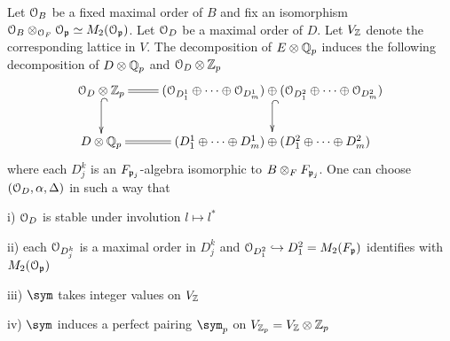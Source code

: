 \documentclass{amsart}
\newcommand{\inj}{\hookrightarrow}
\numberwithin{equation}{section}
\begin{document}
Let $\mathcal{O}_B$ be a fixed maximal order of $B$ and fix an isomorphism $\mathcal{O}_B
\otimes_{\mathcal{O}_F} \mathcal{O}_{\mathfrak{p}} \simeq M_2(\mathcal{O}_{\mathfrak{p}})$. Let $\mathcal{O}_D$ be a maximal order
of $D$. Let $V_{\mathbb{Z}}$ denote the corresponding lattice in $V$. The 
decomposition of $E\otimes \mathbb{Q}_p$ induces the following decomposition of 
$D \otimes \mathbb{Q}_p$ and $\mathcal{O}_D\otimes \mathbb{Z}_p$
$$\xymatrix{
\Ou_D \otimes \Z_p \ar@{^{(}->}[d] \ar@{=}[r]&  (\Ou_{D^1_1} \oplus \cdots \oplus \Ou_{D^1_m}) 
\oplus (\Ou_{D_1^2} \oplus \cdots \oplus \Ou_{D^2_m}) \ar@{^{(}->}[d] \\
D \otimes \Q_p \ar@{=}[r]& 
(D_1^1 \oplus \cdots \oplus D^1_m) \oplus (D_1^2 \oplus
\cdots \oplus D_m^2) 
}$$
where each $D_j^k$ is an $F_{\mathfrak{p}_j}$-algebra isomorphic to $B \otimes_F
F_{\mathfrak{p}_j}$. One can choose $(\mathcal{O}_D,\alpha,\Delta)$ in such a way that

i) $\mathcal{O}_D$ is stable under involution $l \mapsto l^*$

ii) each $\mathcal{O}_{D_j^k}$ is a maximal order in $D^k_j$ and $\Ou_{D^2_1} \inj
D_1^2= M_2(F_\gp)$ identifies with $M_2(\mathcal{O}_{\mathfrak{p}})$

iii) $\sym$ takes integer values on $V_{\mathbb{Z}}$

iv) $\sym$ induces a perfect pairing $\sym_p$ on $V_{\mathbb{Z}_p} = V_{\mathbb{Z}} \otimes 
\mathbb{Z}_p$
\end{document}
